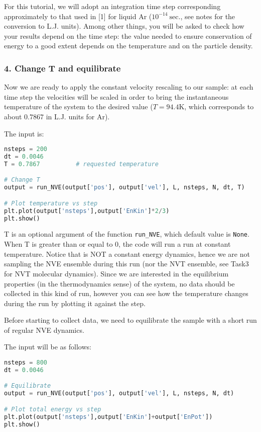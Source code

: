 \documentclass[12pt]{article}
\begin{document}
For this tutorial, we will adopt an integration time step corresponding
approximately to that used in [1] for liquid Ar ($10^{-14}~\mathrm{sec}$., see
notes for the conversion to L.J. units). Among other things, you will be asked
to check how your results depend on the time step: the value needed to ensure
conservation of energy to a good extent depends on the temperature and on the
particle density.

\subsubsection*{4. Change T and equilibrate}

Now we are ready to apply the constant velocity rescaling to our sample: at
each time step the velocities will be scaled in order to bring the
instantaneous temperature of the system to the desired value ($T=94.4\mathrm{K}$, which
corresponds to about $0.7867$ in L.J. units for Ar).

The input is:

\begin{lstlisting}[language=python]
nsteps = 200
dt = 0.0046
T = 0.7867          # requested temperature

# Change T 
output = run_NVE(output['pos'], output['vel'], L, nsteps, N, dt, T)

# Plot temperature vs step
plt.plot(output['nsteps'],output['EnKin']*2/3)
plt.show()
\end{lstlisting}

T is an optional argument of the function \verb!run_NVE!, which default value is \verb!None!.
When T is greater than or equal to 0, the code
will run a run at constant temperature. Notice that is NOT a constant energy
dynamics, hence we are not sampling the NVE ensemble during this run (nor the
NVT ensemble, see Task3 for NVT molecular dynamics). Since we are interested 
in the equilibrium properties (in the thermodynamics sense) of the system, 
no data should be collected in this kind of run, however you can see how the
temperature changes during the run by plotting it against the step.

Before starting to collect data, we need to equilibrate the sample with a short
run of regular NVE dynamics. 

The input will be as follows:
\begin{lstlisting}[language=python]
nsteps = 800
dt = 0.0046

# Equilibrate
output = run_NVE(output['pos'], output['vel'], L, nsteps, N, dt)

# Plot total energy vs step
plt.plot(output['nsteps'],output['EnKin']+output['EnPot'])
plt.show()
\end{lstlisting}
\end{document}
